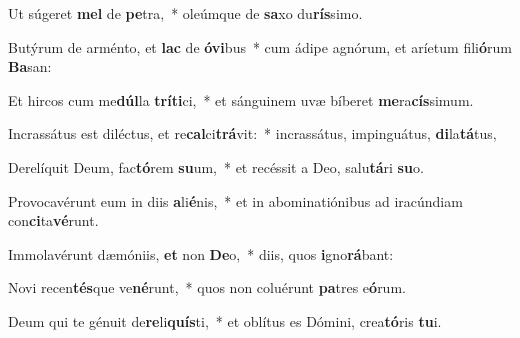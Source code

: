 \item Ut súgeret \textbf{mel} de \textbf{pe}tra,~* oleúmque de \textbf{sa}xo du\textbf{rís}simo.
\item Butýrum de arménto, et \textbf{lac} de \textbf{ó}\textbf{vi}bus~* cum ádipe agnórum, et aríetum fili\textbf{ó}rum \textbf{Ba}san:
\item Et hircos cum me\textbf{dúl}la \textbf{trí}\textbf{ti}ci,~* et sánguinem uvæ bíberet \textbf{me}ra\textbf{cís}simum.
\item Incrassátus est diléctus, et re\textbf{cal}ci\textbf{trá}vit:~* incrassátus, impinguátus, \textbf{di}la\textbf{tá}tus,
\item Derelíquit Deum, fac\textbf{tó}rem \textbf{su}um,~* et recéssit a Deo, salu\textbf{tá}ri \textbf{su}o.
\item Provocavérunt eum in diis \textbf{a}li\textbf{é}nis,~* et in abominatiónibus ad iracúndiam con\textbf{ci}ta\textbf{vé}runt.
\item Immolavérunt dæmóniis, \textbf{et} non \textbf{De}o,~* diis, quos \textbf{i}gno\textbf{rá}bant:
\item Novi recen\textbf{tés}que ve\textbf{né}runt,~* quos non coluérunt \textbf{pa}tres e\textbf{ó}rum.
\item Deum qui te génuit de\textbf{re}li\textbf{quís}ti,~* et oblítus es Dómini, crea\textbf{tó}ris \textbf{tu}i.
